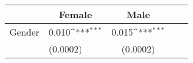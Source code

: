 {
\def\sym#1{\ifmmode^{#1}\else\(^{#1}\)\fi}
\begin{tabular*}{.6\hsize}{@{\hskip\tabcolsep\extracolsep\fill}l*{2}{lc}}
\toprule
                &\multicolumn{1}{c}{Female}&\multicolumn{1}{c}{Male}\\
\midrule
Gender          &    0.010\sym{***}&    0.015\sym{***}\\
                & (0.0002)         & (0.0002)         \\
\bottomrule
\end{tabular*}
}
